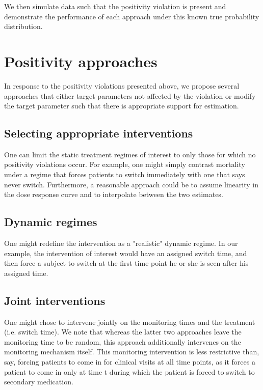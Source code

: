 \documentclass{article}\usepackage[]{graphicx}\usepackage[]{color}
\renewcommand{\indent}{\hskip 20pt}
\begin{document}
We then simulate data such that the positivity violation is present and
demonstrate the performance of each approach under this known true probability distribution. 



\section{Positivity approaches}
\label{sec:proposals}

\indent In response to the positivity violations presented above, we propose
several approaches that either target parameters not affected by the violation or
modify the target parameter such that there is appropriate support for
estimation. 

\subsection{Selecting appropriate interventions}

\indent One can limit the static treatment regimes of interest to only those for
which no positivity violations occur. For example, one might simply contrast mortality
under a regime that forces patients to switch immediately with one that says
never switch. Furthermore, a reasonable approach could be to assume linearity in
the dose response curve and to interpolate between the two estimates. 

\subsection{Dynamic regimes}

\indent One might redefine the intervention as a "realistic" dynamic regime. In
our example, the intervention of interest would have an assigned switch time, and
then force a subject to switch at the first time point he or she is seen after
his assigned time.

\subsection{Joint interventions}

\indent One might chose to intervene jointly on the monitoring times and the
treatment (i.e. switch time). We note that whereas the latter two approaches leave the
monitoring time to be random, this approach additionally intervenes on the
monitoring mechanism itself. This monitoring intervention is less restrictive
than, say, forcing patients to come in for clinical visits at all time points,
as it forces a patient to come in only at time t during which the patient is
forced to switch to secondary medication.
\end{document}
